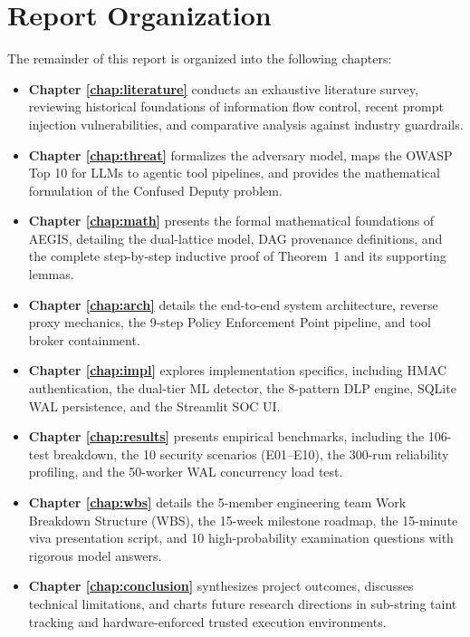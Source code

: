 \section{Report Organization}
The remainder of this report is organized into the following chapters:
\begin{itemize}
    \item \textbf{Chapter \ref{chap:literature}} conducts an exhaustive literature survey, reviewing historical foundations of information flow control, recent prompt injection vulnerabilities, and comparative analysis against industry guardrails.
    \item \textbf{Chapter \ref{chap:threat}} formalizes the adversary model, maps the OWASP Top 10 for LLMs to agentic tool pipelines, and provides the mathematical formulation of the Confused Deputy problem.
    \item \textbf{Chapter \ref{chap:math}} presents the formal mathematical foundations of AEGIS, detailing the dual-lattice model, DAG provenance definitions, and the complete step-by-step inductive proof of Theorem~1 and its supporting lemmas.
    \item \textbf{Chapter \ref{chap:arch}} details the end-to-end system architecture, reverse proxy mechanics, the 9-step Policy Enforcement Point pipeline, and tool broker containment.
    \item \textbf{Chapter \ref{chap:impl}} explores implementation specifics, including HMAC authentication, the dual-tier ML detector, the 8-pattern DLP engine, SQLite WAL persistence, and the Streamlit SOC UI.
    \item \textbf{Chapter \ref{chap:results}} presents empirical benchmarks, including the 106-test breakdown, the 10 security scenarios (E01--E10), the 300-run reliability profiling, and the 50-worker WAL concurrency load test.
    \item \textbf{Chapter \ref{chap:wbs}} details the 5-member engineering team Work Breakdown Structure (WBS), the 15-week milestone roadmap, the 15-minute viva presentation script, and 10 high-probability examination questions with rigorous model answers.
    \item \textbf{Chapter \ref{chap:conclusion}} synthesizes project outcomes, discusses technical limitations, and charts future research directions in sub-string taint tracking and hardware-enforced trusted execution environments.
\end{itemize}

